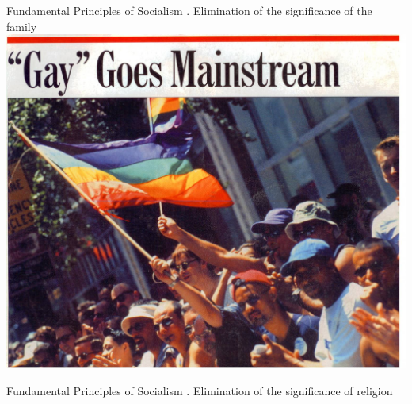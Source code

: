 \begin{frame}{Fundamental Principles of Socialism}
    . Elimination of the significance of the family \\
    \includegraphics[height=.9\textheight]{img/gay.jpg} \\
\end{frame}

\begin{frame}{Fundamental Principles of Socialism}
    . Elimination of the significance of religion \\
\end{frame}

